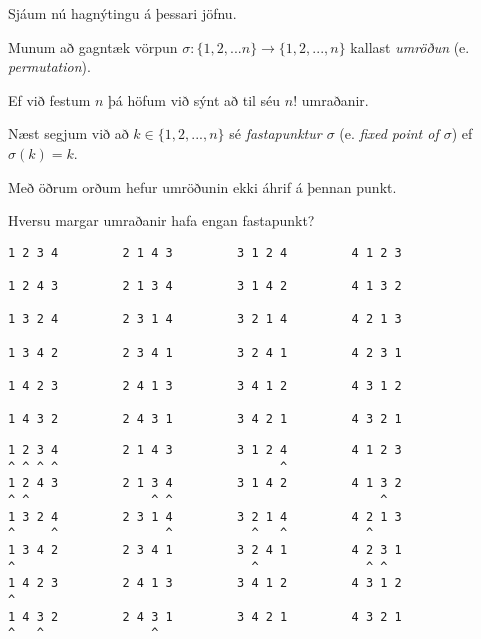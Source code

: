 {
	{
		\item<1-> Sjáum nú hagnýtingu á þessari jöfnu.
		\item<2-> Munum að gagntæk vörpun $\sigma \colon \{1, 2, ... n\} \rightarrow \{1, 2, ..., n\}$ kallast \emph{umröðun} (e. \emph{permutation}).
		\item<3-> Ef við festum $n$ þá höfum við sýnt að til séu $n!$ umraðanir.
		\item<4-> Næst segjum við að $k \in \{1, 2, ..., n\}$ sé \emph{fastapunktur $\sigma$} (e. \emph{fixed point of $\sigma$}) ef $\sigma(k) = k$.
		\item<5-> Með öðrum orðum hefur umröðunin ekki áhrif á þennan punkt.
		\item<6-> Hversu margar umraðanir hafa engan fastapunkt?
	}
}

{ \begin{verbatim}
1 2 3 4         2 1 4 3         3 1 2 4         4 1 2 3

1 2 4 3         2 1 3 4         3 1 4 2         4 1 3 2

1 3 2 4         2 3 1 4         3 2 1 4         4 2 1 3

1 3 4 2         2 3 4 1         3 2 4 1         4 2 3 1

1 4 2 3         2 4 1 3         3 4 1 2         4 3 1 2

1 4 3 2         2 4 3 1         3 4 2 1         4 3 2 1

\end{verbatim}}
{ \begin{verbatim}
1 2 3 4         2 1 4 3         3 1 2 4         4 1 2 3
^ ^ ^ ^                               ^                
1 2 4 3         2 1 3 4         3 1 4 2         4 1 3 2
^ ^                 ^ ^                             ^  
1 3 2 4         2 3 1 4         3 2 1 4         4 2 1 3
^     ^               ^           ^   ^           ^    
1 3 4 2         2 3 4 1         3 2 4 1         4 2 3 1
^                                 ^               ^ ^  
1 4 2 3         2 4 1 3         3 4 1 2         4 3 1 2
^                                                      
1 4 3 2         2 4 3 1         3 4 2 1         4 3 2 1
^   ^               ^                                  
\end{verbatim}}
